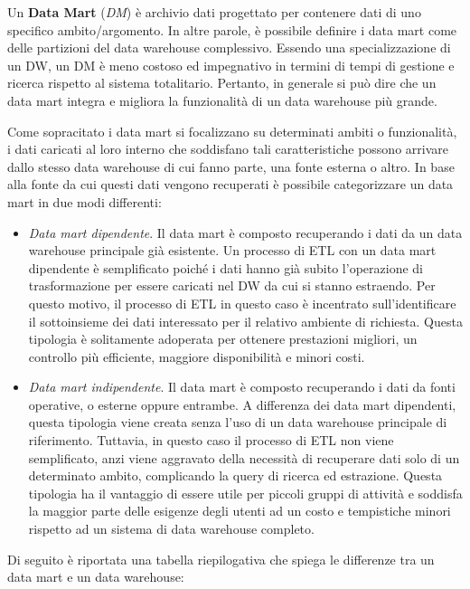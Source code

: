 Un \textbf{Data Mart} (\textit{DM}) è archivio dati progettato per contenere dati di uno specifico ambito/argomento. In altre parole, è possibile definire i data mart come delle partizioni del data warehouse complessivo. Essendo una specializzazione di un DW, un DM è meno costoso ed impegnativo in termini di tempi di gestione e ricerca rispetto al sistema totalitario. Pertanto, in generale si può dire che un data mart integra e migliora la funzionalità di un data warehouse più grande.

Come sopracitato i data mart si focalizzano su determinati ambiti o funzionalità, i dati caricati al loro interno che soddisfano tali caratteristiche possono arrivare dallo stesso data warehouse di cui fanno parte, una fonte esterna o altro. In base alla fonte da cui questi dati vengono recuperati è possibile categorizzare un data mart in due modi differenti:\cite{itl_data_warehousing_and_mining}

\begin{itemize}
    \item \textit{Data mart dipendente}. Il data mart è composto recuperando i dati da un data warehouse principale già esistente. Un processo di ETL con un data mart dipendente è semplificato poiché i dati hanno già subito l'operazione di trasformazione per essere caricati nel DW da cui si stanno estraendo. Per questo motivo, il processo di ETL in questo caso è incentrato sull'identificare il sottoinsieme dei dati interessato per il relativo ambiente di richiesta. Questa tipologia è solitamente adoperata per ottenere prestazioni migliori, un controllo più efficiente, maggiore disponibilità e minori costi.
    \item \textit{Data mart indipendente}. Il data mart è composto recuperando i dati da fonti operative, o esterne oppure entrambe. A differenza dei data mart dipendenti, questa tipologia viene creata senza l'uso di un data warehouse principale di riferimento. Tuttavia, in questo caso il processo di ETL non viene semplificato, anzi viene aggravato della necessità di recuperare dati solo di un determinato ambito, complicando la query di ricerca ed estrazione. Questa tipologia ha il vantaggio di essere utile per piccoli gruppi di attività e soddisfa la maggior parte delle esigenze degli utenti ad un costo e tempistiche minori rispetto ad un sistema di data warehouse completo.
\end{itemize}

Di seguito è riportata una tabella riepilogativa che spiega le differenze tra un data mart e un data warehouse:\cite{streamsets_data_mart_vs_data_warehouse}

